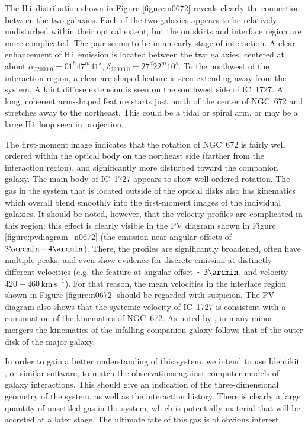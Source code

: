 \documentclass[oldversion]{aa}
\newcommand{\HI}{{\sc H\,i}}
\begin{document}
The \HI\ distribution shown in Figure \ref{figure:n0672} reveals clearly the connection between the two galaxies. Each of the two galaxies appears to be relatively undisturbed within their optical extent, but the outskirts and interface region are more complicated. The pair seems to be in an early stage of interaction. A clear enhancement of \HI\ emission is located between the two galaxies, centered at about $\alpha_{\mathrm{J2000.0}}=01^{h}47^{m}41^{s}$, $\delta_{\mathrm{J2000.0}}=27^{d}22^{m}10^{s}$. To the northwest of the interaction region, a clear arc-shaped feature is seen extending away from the system. A faint diffuse extension is seen on the southwest side of IC~1727. A long, coherent arm-shaped feature starts just north of the center of NGC~672 and stretches away to the northeast. This could be a tidal or spiral arm, or may be a large \HI\ loop seen in projection.

The first-moment image indicates that the rotation of NGC~672 is fairly well ordered within the optical body on the northeast side (farther from the interaction region), and significantly more disturbed toward the companion galaxy. The main body of IC~1727 appears to show well ordered rotation. The gas in the system that is located outside of the optical disks also has kinematics which overall blend smoothly into the first-moment images of the individual galaxies. It should be noted, however, that the velocity profiles are complicated in this region; this effect is clearly visible in the PV diagram shown in Figure \ref{figure:pvdiagram_n0672} (the emission near angular offsets of $3\arcmin-4\arcmin$). There, the profiles are significantly broadened, often have multiple peaks, and even show evidence for discrete emission at distinctly different velocities (e.g. the feature at angular offset $\sim3\arcmin$, and velocity $420-460\,\mathrm{km\,s}^{-1}$). For that reason, the mean velocities in the interface region shown in Figure \ref{figure:n0672} should be regarded with suspicion. The PV diagram also shows that the systemic velocity of IC~1727 is consistent with a continuation of the kinematics of NGC~672. As noted by \citet{sancisi_etal_2008}, in many minor mergers the kinematics of the infalling companion galaxy follows that of the outer disk of the major galaxy.

In order to gain a better understanding of this system, we intend to use Identikit \citep{barnes_hibbard_2009}, or similar software, to match the observations against computer models of galaxy interactions. This should give an indication of the three-dimensional geometry of the system, as well as the interaction history. There is clearly a large quantity of unsettled gas in the system, which is potentially material that will be accreted at a later stage. The ultimate fate of this gas is of obvious interest.
\end{document}
